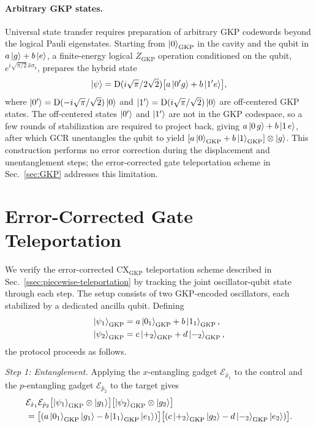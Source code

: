 \documentclass[aps,prx,showpacs,notitlepage,twocolumn,superscriptaddress,nofootinbib,preprintnumbers,floatfix,10pt, longbibliography]{revtex4-2}
\begin{document}
{\paragraph{Arbitrary GKP states.}
Universal state transfer requires preparation of arbitrary GKP codewords
beyond the logical Pauli eigenstates.  Starting from $\ket{0}_\mathrm{GKP}$
in the cavity and the qubit in $a\ket{g}+b\ket{e}$, a finite-energy logical
$Z_\mathrm{GKP}$ operation conditioned on the qubit,
$e^{i\sqrt{\pi/2}\,\hat{x}\sigma_\mathrm{z}}$, prepares the hybrid state
\begin{align}
  \ket{\psi} = \mathrm{D}(i\sqrt{\pi}/2\sqrt{2})
               \bigl[a\ket{0' g}+b\ket{1' e}\bigr],
\end{align}
where $\ket{0'}=\mathrm{D}(-i\sqrt{\pi}/\sqrt{2})\ket{0}$ and
$\ket{1'}=\mathrm{D}(i\sqrt{\pi}/\sqrt{2})\ket{0}$ are off-centered GKP
states.  The off-centered states $\ket{0'}$ and $\ket{1'}$ are not in the GKP 
codespace, so a few rounds of stabilization are required to project back, 
giving $a\ket{0\,g}+b\ket{1\,e}$, after which GCR unentangles the qubit 
to yield $[a\ket{0}_\mathrm{GKP}+b\ket{1}_\mathrm{GKP}]\otimes\ket{g}$.
This construction performs no error correction during the displacement and
unentanglement steps; the error-corrected gate teleportation scheme in
Sec.~\ref{sec:GKP} addresses this limitation.

\section{Error-Corrected Gate Teleportation}\label{app:c-pauli}

We verify the error-corrected $\mathrm{CX}_\mathrm{GKP}$ teleportation
scheme described in Sec.~\ref{ssec:piecewise-teleportation} by tracking
the joint oscillator-qubit state through each step.  The setup consists
of two GKP-encoded oscillators, each stabilized by a dedicated ancilla
qubit.  Defining
\begin{align}
  \ket{\psi_1}_\mathrm{GKP} &= a\ket{0_1}_\mathrm{GKP}+b\ket{1_1}_\mathrm{GKP},\\
  \ket{\psi_2}_\mathrm{GKP} &= c\ket{+_2}_\mathrm{GKP}+d\ket{-_2}_\mathrm{GKP},
\end{align}
the protocol proceeds as follows.

\textit{Step 1: Entanglement.}
Applying the $x$-entangling gadget $\mathcal{E}_{\hat{x}_1}$ to the
control and the $p$-entangling gadget $\mathcal{E}_{\hat{p}_2}$ to the
target gives
\begin{align}
  &\mathcal{E}_{\hat{x}_1}\mathcal{E}_{\hat{p}_2}
   \bigl[\ket{\psi_1}_\mathrm{GKP}\otimes\ket{g_1}\bigr]
   \bigl[\ket{\psi_2}_\mathrm{GKP}\otimes\ket{g_2}\bigr]
   \nonumber\\
  &= \bigl[(a\ket{0_1}_\mathrm{GKP}\ket{g_1}
            -b\ket{1_1}_\mathrm{GKP}\ket{e_1})\bigr]
     \bigl[(c\ket{+_2}_\mathrm{GKP}\ket{g_2}
            -d\ket{-_2}_\mathrm{GKP}\ket{e_2})\bigr].
\end{align}

}
\end{document}
